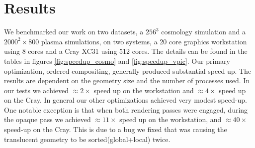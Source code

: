 \documentclass[a4paper,10pt]{report}
\begin{document}
\section{Results}
We benchmarked our work on two datasets, a $256^3$ cosmology simulation and a $2000^2 \times 800$ plasma simulations, on two systems, a 20 core graphics workstation using 8 cores and a Cray XC31 using 512 cores. The details can be found in the tables in figures \ref{fig:speedup_cosmo} and \ref{fig:speedup_vpic}. Our primary optimization, ordered compositing, generally produced substantial speed up. The results are dependent on the geometry size and the number of processes used. In our tests we achieved $\approx 2 \times$ speed up on the workstation and $\approx 4 \times$ speed up on the Cray. In general our other optimizations achieved very modest speed-up. One notable exception is that when both rendering passes were engaged, during the opaque pass we achieved $\approx 11 \times$ speed up on the workstation, and $\approx 40 \times$ speed-up on the Cray. This is due to a bug we fixed that was causing the translucent geometry to be sorted(global+local) twice.
\end{document}
